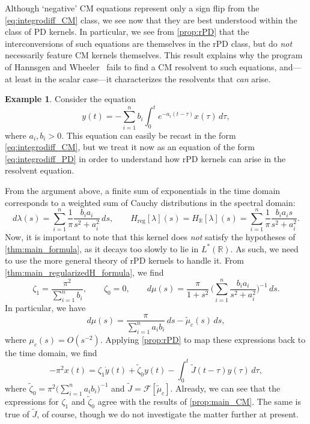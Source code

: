 \documentclass{cams-l} %
\newcommand{\RR}{\mathbb R}
\newcommand{\cF}{\mathcal F}
\theoremstyle{definition}
\newtheorem{example}[theorem]{Example}
\theoremstyle{remark}
\numberwithin{equation}{section}
\begin{document}
Although `negative' CM equations represent only a sign flip from the \ref{eq:integrodiff_CM} class, we see now that they are best understood within the class of PD kernels. In particular, we see from \cref{prop:rPD} that the interconversions of such equations are themselves in the rPD class, but do \emph{not} necessarily feature CM kernels themselves. This result explains why the program of Hannsgen and Wheeler~\cite{doi:10.1137/0513067} fails to find a CM resolvent to such equations, and---at least in the scalar case---it characterizes the resolvents that \emph{can} arise.


\begin{example}\label{ex:negativeCM}
    Consider the equation
    \[y(t) = -\sum_{i=1}^n b_i\int_0^t e^{-a_i(t-\tau)}x(\tau)\,d\tau,\]
    where $a_i,b_i>0$. This equation can easily be recast in the form \ref{eq:integrodiff_CM}, but we treat it now as an equation of the form \ref{eq:integrodiff_PD} in order to understand how rPD kernels can arise in the resolvent equation.
    
    From the argument above, a finite sum of exponentials in the time domain corresponds to a weighted sum of Cauchy distributions in the spectral domain:
    \begin{equation}
        d\lambda(s) = \sum_{i=1}^n\frac{1}{\pi}\frac{b_ia_i}{s^2 + a_i^2}\,ds,\qquad H_\mathrm{reg}[\lambda](s) = H_\RR[\lambda](s) = \sum_{i=1}^n\frac{1}{\pi}\frac{b_ia_i s}{s^2 + a_i^2}.
    \end{equation}
    Now, it is important to note that this kernel does \emph{not} satisfy the hypotheses of \cref{thm:main_formula}, as it decays too slowly to lie in $L^*(\RR)$. As such, we need to use the more general theory of rPD kernels to handle it. From \cref{thm:main_regularizedH_formula}, we find
    \[\zeta_1 = \frac{\pi^2}{\sum_{i=1}^n b_i},\qquad \zeta_0 =0,\qquad d\mu(s) = \frac{\pi}{1+s^2}\,\bigg(\sum_{i=1}^n\frac{b_ia_i}{s^2+a_i^2}\bigg)^{-1}\,ds.\]
    In particular, we have
    \[d\mu(s) = \frac{\pi}{\sum_{i=1}^n a_ib_i}\,ds - \widetilde{\mu}_c(s)\,ds,\]
    where $\mu_c(s) = O(s^{-2})$. Applying \cref{prop:rPD} to map these expressions back to the time domain, we find
    \[-\pi^2x(t) = \zeta_1\dot{y}(t) + \widetilde{\zeta}_0y(t) - \int_0^t \widetilde{J}(t-\tau)y(\tau)\,d\tau,\]
    where $\widetilde{\zeta}_0 = \pi^2\big(\sum_{i=1}^n a_ib_i\big)^{-1}$ and $\widetilde{J} = \cF[\widetilde{\mu}_c]$. Already, we can see that the expressions for $\zeta_1$ and $\widetilde{\zeta}_0$ agree with the results of \cref{prop:main_CM}. The same is true of $\widetilde{J}$, of course, though we do not investigate the matter further at present.
\end{example}
\end{document}
